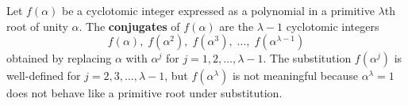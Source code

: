 Let $f(\alpha)$ be a cyclotomic integer expressed as a polynomial in a primitive $\lambda$th root of unity $\alpha$. The \textbf{conjugates} of $f(\alpha)$ are the $\lambda-1$ cyclotomic integers
$$f(\alpha), \; f(\alpha^2), \; f(\alpha^3), \; \ldots, \; f(\alpha^{\lambda-1})$$
obtained by replacing $\alpha$ with $\alpha^j$ for $j = 1, 2, \ldots, \lambda-1$. The substitution $f(\alpha^j)$ is well-defined for $j = 2, 3, \ldots, \lambda-1$, but $f(\alpha^\lambda)$ is not meaningful because $\alpha^\lambda = 1$ does not behave like a primitive root under substitution.
